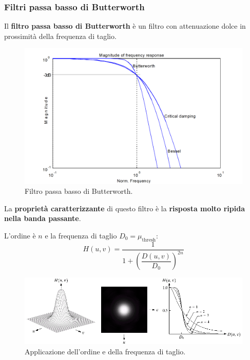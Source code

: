 \documentclass[a4paper]{article}
\begin{document}
	\subsubsection{Filtri passa basso di Butterworth}
	
	Il \textcolor{Red3}{\textbf{filtro passa basso di Butterworth}} è un filtro con attenuazione dolce in prossimità della frequenza di taglio.	
	\begin{figure}[!htp]
		\centering
		\includegraphics[width=.9\textwidth]{img/filtro_passa_basso_butterworth.png}
		\caption{Filtro passa basso di Butterworth.}
	\end{figure}
	La \textbf{proprietà caratterizzante} di questo filtro è la \textbf{risposta molto ripida nella banda passante}.\newline
	
	\noindent
	L'ordine è $n$ e la frequenza di taglio $D_{0} = \mu_{\text{thresh}}$:
	\begin{equation*}
		H\left(u,v\right) = \dfrac{1}{1 + \left(\dfrac{D\left(u,v\right)}{D_{0}}\right)^{2n}}
	\end{equation*}

	\begin{figure}[!htp]
		\centering
		\includegraphics[width=\textwidth]{img/filtro_passa_basso_butterworth-ordine.png}
		\caption{Applicazione dell'ordine e della frequenza di taglio.}
	\end{figure}
\end{document}
